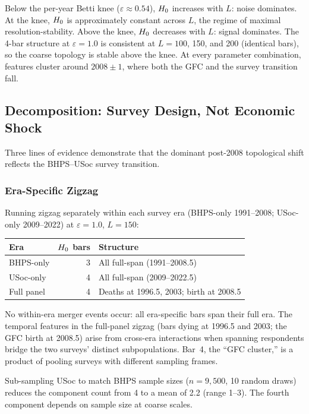Below the per-year Betti knee ($\varepsilon \approx 0.54$), $H_{0}$ increases
with $L$: noise dominates.
At the knee, $H_{0}$ is approximately constant across $L$, the regime of
maximal resolution-stability.
Above the knee, $H_{0}$ decreases with $L$: signal dominates.
The 4-bar structure at $\varepsilon = 1.0$ is consistent at $L = 100$, 150, and
200 (identical bars), so the coarse topology is stable above the knee.
At every parameter combination, features cluster around $2008 \pm 1$, where both
the GFC and the survey transition fall.

\subsection{Decomposition: Survey Design, Not Economic Shock}
\label{sec:decomp}

Three lines of evidence demonstrate that the dominant post-2008 topological shift
reflects the BHPS--USoc survey transition.

\subsubsection{Era-Specific Zigzag}

Running zigzag separately within each survey era (BHPS-only 1991--2008;
USoc-only 2009--2022) at $\varepsilon = 1.0$, $L = 150$:

\begin{center}
  \begin{tabular}{lrl}
    \toprule
    Era & $H_{0}$ bars & Structure \\
    \midrule
    BHPS-only & 3 & All full-span (1991--2008.5) \\
    USoc-only & 4 & All full-span (2009--2022.5) \\
    Full panel & 4 & Deaths at 1996.5, 2003; birth at 2008.5 \\
    \bottomrule
  \end{tabular}
\end{center}

No within-era merger events occur: all era-specific bars span their full era.
The temporal features in the full-panel zigzag (bars dying at 1996.5 and 2003;
the GFC birth at 2008.5) arise from cross-era interactions when spanning
respondents bridge the two surveys' distinct subpopulations.
Bar~4, the ``GFC cluster,'' is a product of pooling surveys with different
sampling frames.

Sub-sampling USoc to match BHPS sample sizes ($n = 9{,}500$, 10 random draws)
reduces the component count from 4 to a mean of 2.2 (range 1--3).
The fourth component depends on sample size at coarse scales.

